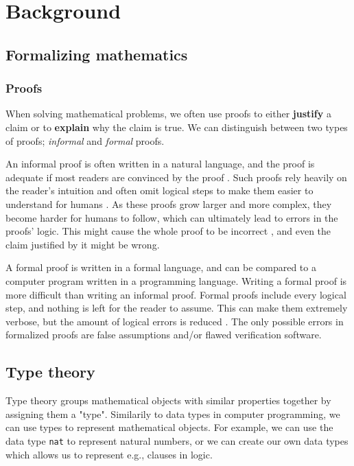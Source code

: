 \chapter{Background}

\section{Formalizing mathematics}
\label{sec:formalizing_mathematics}

\subsection{Proofs}
\label{ssec:proofs}

When solving mathematical problems, we often use proofs
to either \textbf{justify} a claim or to \textbf{explain} why the claim is true.
We can distinguish between two types of proofs; \textit{informal} and \textit{formal} proofs.

An informal proof is often written in a natural language, and the proof is adequate if most
readers are convinced by the proof \cite{bpierce}. Such proofs rely heavily on the reader's intuition
and often omit logical steps to make them easier to understand for humans \cite{ams:formal-proof}.
As these proofs grow larger and more complex, they become harder for humans to follow,
which can ultimately lead to errors in the proofs' logic. This might cause the whole proof
to be incorrect \cite{rkhamsi}, and even the claim justified by it might be wrong.

A formal proof is written in a formal language, and can be compared to a computer program
written in a programming language. Writing a formal proof is more difficult than writing an informal proof.
Formal proofs include every logical step, and nothing is left for the reader to assume.
This can make them extremely verbose, but the amount of logical errors is reduced \cite{ams:formal-proof}.
The only possible errors in formalized proofs are false assumptions and/or flawed verification software.

\section{Type theory}
\label{sec:type_theory}

Type theory groups mathematical objects with similar properties together by assigning them a "type".
Similarily to data types in computer programming, we can use types to represent mathematical
objects. For example, we can use the data type \texttt{nat} to represent natural numbers, or we can create
our own data types which allows us to represent e.g., clauses in logic.

